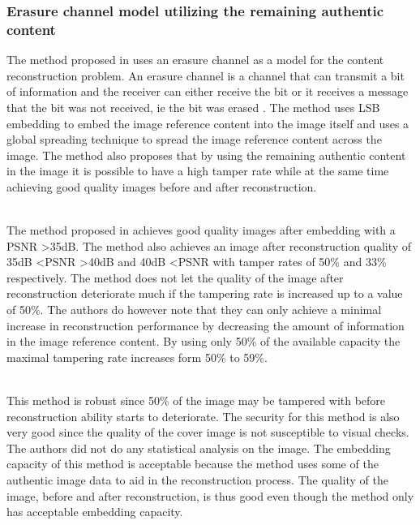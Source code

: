 \documentclass[12pt]{article}
\begin{document}
\subsubsection{Erasure channel model utilizing the remaining authentic content}
\label{ErasureChannelOverview}
The method proposed in \cite {korus2013efficient} uses an erasure channel as a model for the content reconstruction problem.
An erasure channel is a channel that can transmit a bit of information and the receiver can either receive the bit or it receives a message that the bit was not received, ie the bit was erased \cite{korus2013efficient}.
The method uses LSB embedding to embed the image reference content into the image itself and uses a global spreading technique to spread the image reference content across the image.
The method also proposes that by using the remaining authentic content in the image it is possible to have a high tamper rate while at the same time achieving good quality images before and after reconstruction.

\hspace{0pt} \\
The method proposed in \cite {korus2013efficient} achieves good quality images after embedding with a PSNR \textgreater 35dB. 
The method also achieves an image after reconstruction quality of 35dB \textless PSNR \textgreater 40dB and 40dB \textless PSNR with tamper rates of 50\% and 33\% respectively.
The method does not let the quality of the image after reconstruction deteriorate much if the tampering rate is increased up to a value of 50\%.
The authors do however note that they can only achieve a minimal increase in reconstruction performance by decreasing the amount of information in the image reference content.
By using only 50\% of the available capacity the maximal tampering rate increases form 50\% to 59\%.

\hspace{0pt} \\
This method \cite {korus2013efficient} is robust since 50\% of the image may be tampered with before reconstruction ability starts to deteriorate.
The security for this method is also very good since the quality of the cover image is not susceptible to visual checks.
The authors did not do any statistical analysis on the image.
The embedding capacity of this method is acceptable because the method uses some of the authentic image data to aid in the reconstruction process. The quality of the image, before and after reconstruction, is thus good even though the method only has acceptable embedding capacity.  
\end{document}
